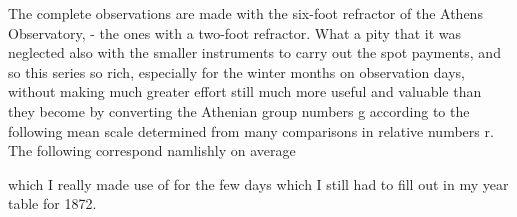 \documentclass[12pt]{article}
\begin{document}
The complete observations are made with the six-foot refractor of the Athens Observatory, - the ones with a two-foot refractor. What a pity that it was neglected also with the smaller instruments to carry out the spot payments, and so this series so rich, especially for the winter months on observation days, without making much greater effort still much more useful and valuable than they become by converting the Athenian group numbers g according to the following mean scale determined from many comparisons in relative numbers r. The following correspond namlishly on average

which I really made use of for the few days which I still had to fill out in my year table for 1872.
\end{document}
